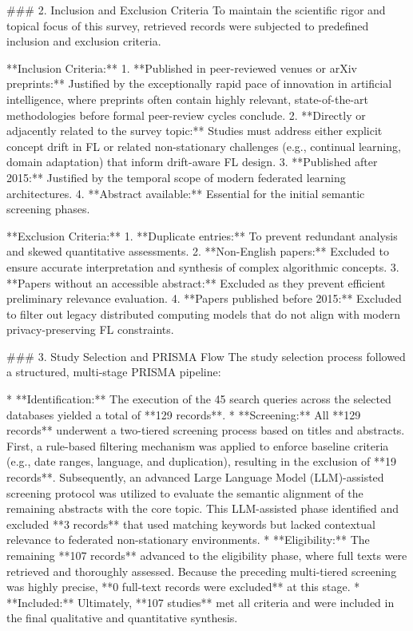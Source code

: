 \documentclass[journal]{IEEEtran}
\begin{document}
\#\#\# 2. Inclusion and Exclusion Criteria
To maintain the scientific rigor and topical focus of this survey, retrieved records were subjected to predefined inclusion and exclusion criteria. 

**Inclusion Criteria:**
1.  **Published in peer-reviewed venues or arXiv preprints:** Justified by the exceptionally rapid pace of innovation in artificial intelligence, where preprints often contain highly relevant, state-of-the-art methodologies before formal peer-review cycles conclude.
2.  **Directly or adjacently related to the survey topic:** Studies must address either explicit concept drift in FL or related non-stationary challenges (e.g., continual learning, domain adaptation) that inform drift-aware FL design.
3.  **Published after 2015:** Justified by the temporal scope of modern federated learning architectures.
4.  **Abstract available:** Essential for the initial semantic screening phases.

**Exclusion Criteria:**
1.  **Duplicate entries:** To prevent redundant analysis and skewed quantitative assessments.
2.  **Non-English papers:** Excluded to ensure accurate interpretation and synthesis of complex algorithmic concepts.
3.  **Papers without an accessible abstract:** Excluded as they prevent efficient preliminary relevance evaluation.
4.  **Papers published before 2015:** Excluded to filter out legacy distributed computing models that do not align with modern privacy-preserving FL constraints.

\#\#\# 3. Study Selection and PRISMA Flow
The study selection process followed a structured, multi-stage PRISMA pipeline:

*   **Identification:** The execution of the 45 search queries across the selected databases yielded a total of **129 records**. 
*   **Screening:** All **129 records** underwent a two-tiered screening process based on titles and abstracts. First, a rule-based filtering mechanism was applied to enforce baseline criteria (e.g., date ranges, language, and duplication), resulting in the exclusion of **19 records**. Subsequently, an advanced Large Language Model (LLM)-assisted screening protocol was utilized to evaluate the semantic alignment of the remaining abstracts with the core topic. This LLM-assisted phase identified and excluded **3 records** that used matching keywords but lacked contextual relevance to federated non-stationary environments.
*   **Eligibility:** The remaining **107 records** advanced to the eligibility phase, where full texts were retrieved and thoroughly assessed. Because the preceding multi-tiered screening was highly precise, **0 full-text records were excluded** at this stage.
*   **Included:** Ultimately, **107 studies** met all criteria and were included in the final qualitative and quantitative synthesis. 
\end{document}
